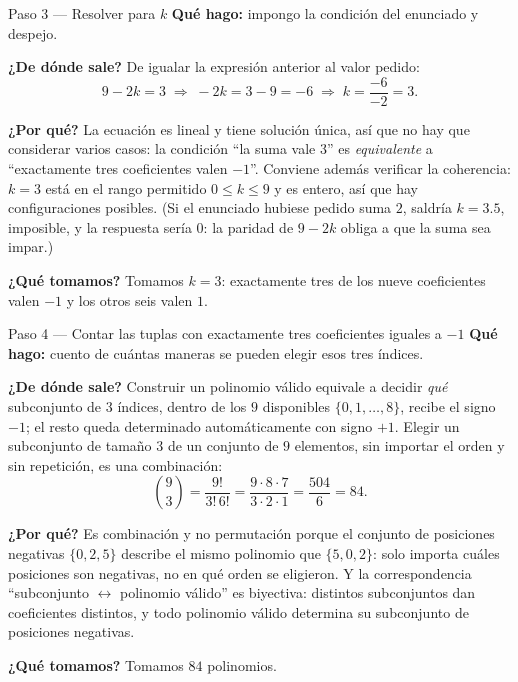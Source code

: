 \documentclass[11pt]{article}
\begin{document}
\begin{paso}{Paso 3 --- Resolver para $k$}
\textbf{Qué hago:} impongo la condición del enunciado y despejo.

\textbf{¿De dónde sale?} De igualar la expresión anterior al valor pedido:
\[
9-2k=3 \;\Longrightarrow\; -2k = 3-9 = -6 \;\Longrightarrow\; k=\frac{-6}{-2}=3.
\]

\textbf{¿Por qué?} La ecuación es lineal y tiene solución única, así que no hay que considerar varios
casos: la condición ``la suma vale $3$'' es \emph{equivalente} a ``exactamente tres coeficientes valen
$-1$''. Conviene además verificar la coherencia: $k=3$ está en el rango permitido $0\le k\le 9$ y es
entero, así que hay configuraciones posibles. (Si el enunciado hubiese pedido suma $2$, saldría
$k=3.5$, imposible, y la respuesta sería $0$: la paridad de $9-2k$ obliga a que la suma sea impar.)

\textbf{¿Qué tomamos?} Tomamos $k=3$: exactamente tres de los nueve coeficientes valen $-1$ y los
otros seis valen $1$.
\end{paso}

\begin{paso}{Paso 4 --- Contar las tuplas con exactamente tres coeficientes iguales a $-1$}
\textbf{Qué hago:} cuento de cuántas maneras se pueden elegir esos tres índices.

\textbf{¿De dónde sale?} Construir un polinomio válido equivale a decidir \emph{qué} subconjunto de
$3$ índices, dentro de los $9$ disponibles $\{0,1,\dots ,8\}$, recibe el signo $-1$; el resto queda
determinado automáticamente con signo $+1$. Elegir un subconjunto de tamaño $3$ de un conjunto de $9$
elementos, sin importar el orden y sin repetición, es una combinación:
\[
\binom{9}{3}=\frac{9!}{3!\,6!}=\frac{9\cdot 8\cdot 7}{3\cdot 2\cdot 1}=\frac{504}{6}=84.
\]

\textbf{¿Por qué?} Es combinación y no permutación porque el conjunto de posiciones negativas
$\{0,2,5\}$ describe el mismo polinomio que $\{5,0,2\}$: solo importa cuáles posiciones son negativas,
no en qué orden se eligieron. Y la correspondencia ``subconjunto $\leftrightarrow$ polinomio válido''
es biyectiva: distintos subconjuntos dan coeficientes distintos, y todo polinomio válido determina su
subconjunto de posiciones negativas.

\textbf{¿Qué tomamos?} Tomamos $84$ polinomios.
\end{paso}
\end{document}
